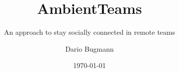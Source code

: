 \documentclass{seal_thesis}
\date{\today}
\title{AmbientTeams}
\subtitle{An approach to stay socially connected in remote teams}
\author{Dario Bugmann}
\begin{document}
\maketitle

\frontmatter

\begin{acknowledgements}

\end{acknowledgements}

\begin{abstract}
\end{abstract}

\begin{zusammenfassung}
\end{zusammenfassung}

\tableofcontents
\listoffigures
\listoftables
\lstlistoflistings

\mainmatter







\begin{appendices}
    
    
\end{appendices}


\backmatter
\printbibliography
\end{document}
